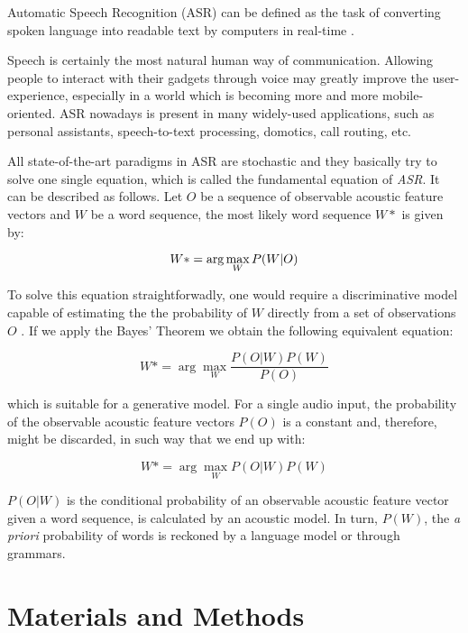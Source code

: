 \documentclass[twocolumn]{bmcart}%
\begin{document}
Automatic Speech Recognition (ASR) can be defined as the task of converting spoken language into readable text by computers in real-time \cite{Huang2001}. 

Speech is certainly the most natural human way of communication. Allowing people to interact with their gadgets through voice may greatly improve the user-experience, especially in a world which is becoming more and more mobile-oriented.  ASR nowadays is present in many widely-used applications, such as personal assistants, speech-to-text processing, domotics, call routing, etc.

All state-of-the-art paradigms in ASR are stochastic and they basically try to solve one single equation, which is called the fundamental equation of \emph{ASR}. It can be described as follows. Let $O$ be a sequence of observable acoustic feature vectors and $W$ be a word sequence, the most likely word sequence $W*$ is given by:

\begin{equation}{\label{eq:fund-asr}}
W*= \arg\max_{W}P(W|O)
\end{equation}

To solve this equation straightforwadly, one would require a discriminative model
capable of estimating the the probability of $W$ directly from a set of observations $O$ \cite{Gales2008}.
If we apply the Bayes' Theorem we obtain the following equivalent equation:

\begin{equation}
W*= \arg\max_{W}\frac{P(O|W)P(W)}{P(O)}
\end{equation}

which is suitable for a generative model. For a single audio input, the probability of the observable acoustic feature vectors $P(O)$ is a constant and, therefore, might be discarded, in such way that we end up with:

\begin{equation}
W*= \arg\max_{W}P(O|W)P(W)
\end{equation}

$P(O|W)$ is the conditional probability of an observable acoustic feature vector given a word sequence, is calculated by an acoustic model. In turn, $P(W)$, the \emph{a priori} probability of words is reckoned by a language model or through grammars.

\section*{Materials and Methods}
\end{document}
